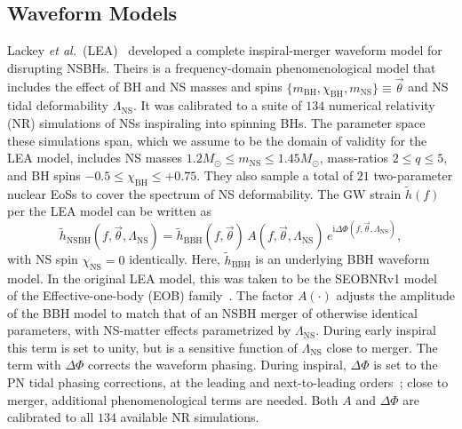 \documentclass[aps,prd,amsmath,floats,floatfix, twocolumn,
superscriptaddress,nofootinbib,showpacs]{revtex4-1}
\newcommand{\red}{\textcolor{red}}
\newcommand{\lambdans}{\Lambda_\mathrm{NS}}
\newcommand{\ii}{\mathrm{i}}
\newcommand{\chibh}{\chi_\mathrm{BH}}
\newcommand{\chins}{\chi_\mathrm{NS}}
\newcommand{\mbh}{m_\mathrm{BH}}
\newcommand{\mns}{m_\mathrm{NS}}
\begin{document}
\subsection{Waveform Models}\label{s2:waveforms}


Lackey {\it et al.}~(LEA)~\cite{Lackey:2013axa} developed a complete inspiral-merger
waveform model for disrupting NSBHs. Theirs is a frequency-domain
phenomenological model that includes the effect of BH and NS masses and spins
$\{\mbh, \chibh, \mns\}\equiv\vec{\theta}$ and NS tidal deformability
$\lambdans$. It was calibrated to a suite of $134$ numerical relativity (NR)
simulations of NSs inspiraling into spinning BHs. The parameter space these
simulations span, which we assume to be the domain of validity for the LEA
model, includes NS masses $1.2M_\odot\leq\mns\leq 1.45M_\odot$,
mass-ratios $2\leq q\leq 5$, and BH spins $-0.5\leq\chibh\leq+0.75$.
They also sample a total of $21$ two-parameter nuclear EoSs to cover the
spectrum of NS deformability.
% 
% 
The GW strain $\tilde{h}(f)$ per the LEA model can be written as
\begin{equation}
 \tilde{h}_\mathrm{NSBH}(f, \vec{\theta}, \lambdans) = \tilde{h}_\mathrm{BBH}(f, \vec{\theta})\,A(f, \vec{\theta}, \lambdans)\,e^{\ii \Delta\Phi(f, \vec{\theta}, \lambdans)},
\end{equation}
with NS spin $\chins=0$ identically. Here, $\tilde{h}_\mathrm{BBH}$ is
an underlying BBH waveform model. In the original LEA model,
this was taken to be the SEOBNRv1
model~\cite{Taracchini:2012} of the Effective-one-body (EOB)
family~\cite{Buonanno99}. The factor $A(\cdot)$ adjusts
the amplitude of the BBH model to match that of an NSBH merger of otherwise
identical parameters, with NS-matter effects parametrized by $\lambdans$.
During early inspiral this term is set to
unity, but is a sensitive function of $\lambdans$ close to merger. The term with
$\Delta\Phi$ corrects the waveform phasing. During inspiral,
$\Delta\Phi$ is set to the PN tidal phasing corrections,
at the leading and next-to-leading orders~\cite{Vines2011}; close to merger,
additional phenomenological terms are needed. Both $A$ and $\Delta\Phi$ are
calibrated to all $134$ available NR simulations.
\end{document}
